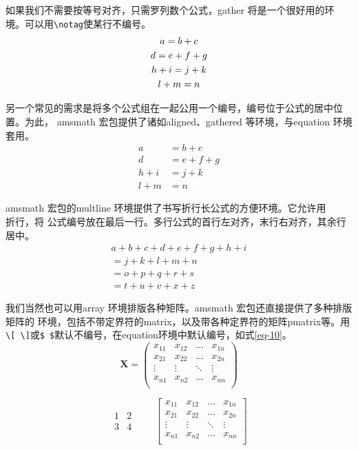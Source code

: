 \documentclass{ctexart}
\theoremstyle{plain} 		     %
\theoremstyle{definition} 		 %
\theoremstyle{remark} 			 %
\begin{document}
如果我们不需要按等号对齐，只需罗列数个公式，gather 将是一个很好用的环境。可以用\verb|\notag|使某行不编号。
\begin{gather}
	a = b + c \\
	d = e + f + g \\
	h + i = j + k \notag \\
	l + m = n
\end{gather}

另一个常见的需求是将多个公式组在一起公用一个编号，编号位于公式的居中位置。为此，
amsmath 宏包提供了诸如aligned、gathered 等环境，与equation 环境套用。
\begin{equation}
	\begin{aligned}
		a &= b + c \\
		d &= e + f + g \\
		h + i &= j + k \\
		l + m &= n
	\end{aligned}
\end{equation}

amsmath 宏包的multline 环境提供了书写折行长公式的方便环境。它允许用\\ 折行，将
公式编号放在最后一行。多行公式的首行左对齐，末行右对齐，其余行居中。
\begin{multline}
	a + b + c + d + e + f
	+ g + h + i \\
	= j + k + l + m + n\\
	= o + p + q + r + s\\
	= t + u + v + x + z
\end{multline}

我们当然也可以用array 环境排版各种矩阵。amsmath 宏包还直接提供了多种排版矩阵的
环境，包括不带定界符的matrix，以及带各种定界符的矩阵pmatrix等。用\verb|\[ \]|或\verb|$ $|默认不编号，在equation环境中默认编号，如式\eqref{eq-10}。
\[ \mathbf{X} = \left(
\begin{array}{cccc}
	x_{11} & x_{12} & \ldots & x_{1n}\\
	x_{21} & x_{22} & \ldots & x_{2n}\\
	\vdots & \vdots & \ddots & \vdots\\
	x_{n1} & x_{n2} & \ldots & x_{nn}\\
\end{array} \right) \]

\begin{equation}
	\begin{matrix}
		1 & 2 \\ 3 & 4
	\end{matrix} \qquad
	\begin{bmatrix}
		x_{11} & x_{12} & \ldots & x_{1n}\\
		x_{21} & x_{22} & \ldots & x_{2n}\\
		\vdots & \vdots & \ddots & \vdots\\
		x_{n1} & x_{n2} & \ldots & x_{nn}\\
	\end{bmatrix}
	\label{eq-10}
\end{equation}
\end{document}
